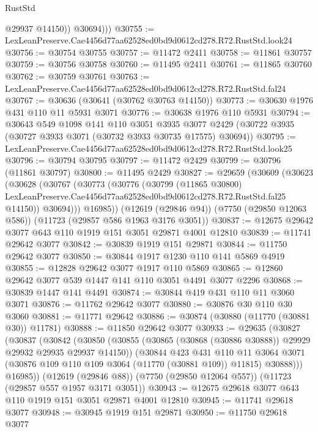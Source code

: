 \begin{lexlean}{RustStd}
\begin{coremodule}
              @29937
              @14150))
          @30694)))
@30755 := LexLeanPreserve.Cae4456d77aa62528ed0bd9d0612cd278.R72.RustStd.look24
@30756 := @30754 @30755
@30757 := @11472 @2411
@30758 := @11861 @30757
@30759 := @30756 @30758
@30760 := @11495 @2411
@30761 := @11865 @30760
@30762 := @30759 @30761
@30763 := LexLeanPreserve.Cae4456d77aa62528ed0bd9d0612cd278.R72.RustStd.fal24
@30767 := @30636 (@30641 (@30762 @30763 @14150))
@30773 := @30630 @1976 @431 @110 @11 @5931 @3071
@30776 := @30638 @1976 @110 @5931
@30794 := @30643
    @549
    @1098
    @141
    @110
    @3051
    @3935
    @3077
    @2429
    (@30722 @3935 (@30727 @3933 @3071 (@30732 @3933 @30735 @17575) @30694))
@30795 := LexLeanPreserve.Cae4456d77aa62528ed0bd9d0612cd278.R72.RustStd.look25
@30796 := @30794 @30795
@30797 := @11472 @2429
@30799 := @30796 (@11861 @30797)
@30800 := @11495 @2429
@30827 := @29659
    (@30609
      (@30623
        (@30628
          (@30767
            (@30773
              (@30776
                (@30799
                  (@11865 @30800)
                  LexLeanPreserve.Cae4456d77aa62528ed0bd9d0612cd278.R72.RustStd.fal25
                  @14150))
              @30694)))
        @16985))
    (@12619 (@29846 @94))
    (@7750 (@29850 @12063 @586))
    (@11723 (@29857 @586 @1963 @3176 @3051))
@30837 := @12675 @29642 @3077 @643 @110 @1919 @151 @3051 @29871 @4001 @12810
@30839 := @11741 @29642 @3077
@30842 := @30839 @1919 @151 @29871
@30844 := @11750 @29642 @3077
@30850 := @30844 @1917 @1230 @110 @141 @5869 @4919
@30855 := @12828 @29642 @3077 @1917 @110 @5869
@30865 := @12860 @29642 @3077 @539 @1447 @141 @110 @3051 @4491 @3077 @2296
@30868 := @30839 @1447 @141 @4491
@30874 := @30844 @419 @431 @110 @11 @3060 @3071
@30876 := @11762 @29642 @3077
@30880 := @30876 @30 @110 @30 @3060
@30881 := @11771 @29642
@30886 := @30874 (@30880 (@11770 (@30881 @30)) @11781)
@30888 := @11850 @29642 @3077
@30933 := @29635
    (@30827
      (@30837
        (@30842
          (@30850
            (@30855 (@30865 (@30868 (@30886 @30888)) @29929 @29932 @29935 @29937 @14150))
            (@30844
              @423
              @431
              @110
              @11
              @3064
              @3071
              (@30876 @109 @110 @109 @3064 (@11770 (@30881 @109)) @11815)
              @30888)))
        @16985))
    (@12619 (@29846 @88))
    (@7750 (@29850 @12064 @557))
    (@11723 (@29857 @557 @1957 @3171 @3051))
@30943 := @12675 @29618 @3077 @643 @110 @1919 @151 @3051 @29871 @4001 @12810
@30945 := @11741 @29618 @3077
@30948 := @30945 @1919 @151 @29871
@30950 := @11750 @29618 @3077

\end{coremodule}
\end{lexlean}
